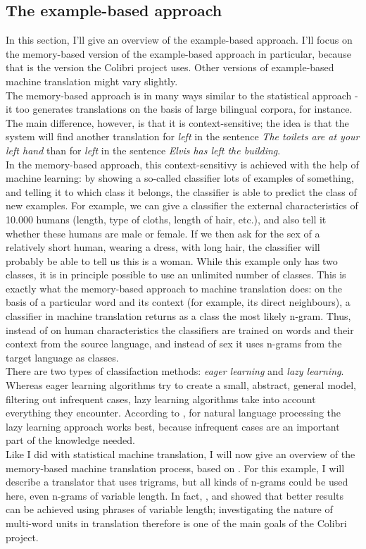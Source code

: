 \documentclass[12pt]{article}
\begin{document}
\subsection{The example-based approach}

In this section, I'll give an overview of the example-based approach. I'll focus on the memory-based version of the example-based approach in particular, because that is the version the Colibri project uses. Other versions of example-based machine translation might vary slightly. \\\indent
The memory-based approach is in many ways similar to the statistical approach - it too generates translations on the basis of large bilingual corpora, for instance. The main difference, however, is that it is context-sensitive; the idea is that the system will find another translation for \emph{left} in the sentence \emph{The toilets are at your left hand} than for \emph{left} in the sentence \emph{Elvis has left the building}. \\\indent
In the memory-based approach, this context-sensitivy is achieved with the help of machine learning: by showing a so-called classifier lots of examples of something, and telling it to which class it belongs, the classifier is able to predict the class of new examples. For example, we can give a classifier the external characteristics of 10.000 humans (length, type of cloths, length of hair, etc.), and also tell it whether these humans are male or female. If we then ask for the sex of a relatively short human, wearing a dress, with long hair, the classifier will probably be able to tell us this is a woman. While this example only has two classes, it is in principle possible to use an unlimited number of classes. This is exactly what the memory-based approach to machine translation does: on the basis of a particular word and its context (for example, its direct neighbours), a classifier in machine translation returns as a class the most likely n-gram. Thus, instead of on human characteristics the classifiers are trained on words and their context from the source language, and instead of sex it uses n-grams from the target language as classes. \\\indent
There are two types of classifaction methods: \emph{eager learning} and \emph{lazy learning}. Whereas eager learning algorithms try to create a small, abstract, general model, filtering out infrequent cases, lazy learning algorithms take into account everything they encounter. According to \citet{dvdb05}, for natural language processing the lazy learning approach works best, because infrequent cases are an important part of the knowledge needed. \\\indent
Like I did with statistical machine translation, I will now give an overview of the memory-based machine translation process, based on \citet{vdbb09}. For this example, I will describe a translator that uses trigrams, but all kinds of n-grams could be used here, even n-grams of variable length. In fact, \citet{vangompel09}, \citet{vangompelea09} and \citet{vangompel11} showed that better results can be achieved using phrases of variable length; investigating the nature of multi-word units in translation therefore is one of the main goals of the Colibri project.
\end{document}
